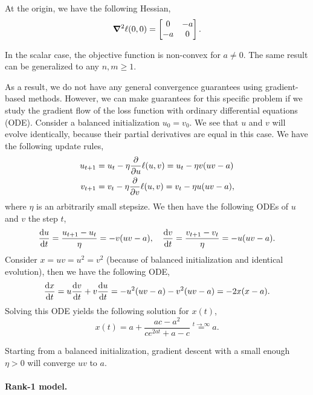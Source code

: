 At the origin, we have the following Hessian, \[
    \bm{\nabla}^2_{\! } \ell(0,0) = \begin{bmatrix}
        0  & -a \\
        -a & 0
    \end{bmatrix}.
\]

\begin{important}
    In the scalar case, the objective function is non-convex for $a \neq 0$. The same result can
    be generalized to any $n,m \geq 1$.
\end{important}

As a result, we do not have any general convergence guarantees using gradient-based methods.
However, we can make guarantees for this specific problem if we study the gradient flow of the loss
function with ordinary differential equations (ODE). Consider a balanced initialization $u_0 =
    v_0$. We see that $u$ and $v$ will evolve identically, because their partial derivatives are equal
in this case. We have the following update rules,
\begin{align*}
    u_{t+1} & = u_t - \eta \pdv*{\ell(u,v)}{u} = u_t - \eta v(uv - a)  \\
    v_{t+1} & = v_t - \eta \pdv*{\ell(u,v)}{v} = v_t - \eta u(uv - a),
\end{align*}
where $\eta$ is an arbitrarily small stepsize. We then have the following ODEs of $u$ and $v$ \wrt the step $t$, \[
    \odv{u}{t} = \frac{u_{t+1} - u_t}{\eta} = -v(uv - a), \quad \odv{v}{t} = \frac{v_{t+1} - v_t}{\eta} = -u(uv - a).
\]
Consider $x = uv = u^2 = v^2$ (because of balanced initialization and identical evolution), then we
have the following ODE, \[
    \odv{x}{t} = u \odv{v}{t} + v \odv{u}{t} = -u^2 (uv - a) - v^2 (uv - a) = -2x(x-a).
\]
Solving this ODE yields the following solution for $x(t)$, \[
    x(t) = a + \frac{ac - a^2}{ce^{2at} + a - c} \overset{t\to\infty}{=} a.
\]

\begin{important}
    Starting from a balanced initialization, gradient descent with a small enough $\eta > 0$
    will converge $uv$ to $a$.
\end{important}

\paragraph{Rank-1 model.}

